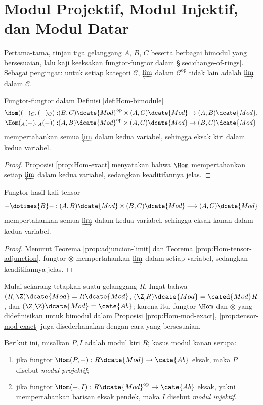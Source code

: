 \section{Modul Projektif, Modul Injektif, dan Modul Datar}
Pertama-tama, tinjau tiga gelanggang $A$, $B$, $C$ beserta berbagai bimodul yang bersesuaian, lalu kaji keeksakan fungtor-fungtor dalam \S\ref{sec:change-of-rings}. Sebagai pengingat: untuk setiap kategori $\mathcal{C}$, $\varprojlim$ dalam $\mathcal{C}^\text{op}$ tidak lain adalah $\varinjlim$ dalam $\mathcal{C}$.
\begin{proposition}\label{prop:Hom-mod-exact}
	Fungtor-fungtor dalam Definisi \ref{def:Hom-bimodule}
	\begin{align*}
		\Hom((-)_C, (-)_C): & (B,C)\dcate{Mod}^\text{op} \times (A,C)\dcate{Mod} \to (A,B)\dcate{Mod}, \\
		\Hom({}_A (-), {}_A(-)): & (A,B)\dcate{Mod}^\text{op} \times (A,C)\dcate{Mod} \to (B,C)\dcate{Mod}
	\end{align*}
	mempertahankan semua $\varprojlim$ dalam kedua variabel, sehingga eksak kiri dalam kedua variabel.
\end{proposition}
\begin{proof}
	Proposisi \ref{prop:Hom-exact} menyatakan bahwa $\Hom$ mempertahankan setiap $\varprojlim$ dalam kedua variabel, sedangkan keaditifannya jelas.
\end{proof}

\begin{proposition}\label{prop:tensor-mod-exact}
	Fungtor hasil kali tensor
	\[ - \dotimes{B} -: (A,B)\dcate{Mod} \times (B,C)\dcate{Mod} \longrightarrow (A,C)\dcate{Mod} \]
	mempertahankan semua $\varinjlim$ dalam kedua variabel, sehingga eksak kanan dalam kedua variabel.
\end{proposition}
\begin{proof}
	Menurut Teorema \ref{prop:adjuncion-limit} dan Teorema \ref{prop:Hom-tensor-adjunction}, fungtor $\otimes$ mempertahankan $\varinjlim$ dalam setiap variabel, sedangkan keaditifannya jelas.
\end{proof}

Mulai sekarang tetapkan suatu gelanggang $R$. Ingat bahwa $(R, \Z)\dcate{Mod} = R\dcate{Mod}$, $(\Z_, R)\dcate{Mod} = \cated{Mod}R$, dan $(\Z_, \Z)\dcate{Mod} = \cate{Ab}$; karena itu, fungtor $\Hom$ dan $\otimes$ yang didefinisikan untuk bimodul dalam Proposisi \ref{prop:Hom-mod-exact}, \ref{prop:tensor-mod-exact} juga disederhanakan dengan cara yang bersesuaian.

\begin{definition}\label{def:inj-proj-modules}
	Berikut ini, misalkan $P, I$ adalah modul kiri $R$; kasus modul kanan serupa:
	\begin{enumerate}
		\item jika fungtor $\Hom(P, -): R\dcate{Mod} \to \cate{Ab}$ eksak, maka $P$ disebut \emph{modul projektif};
		\item jika fungtor $\Hom(-, I): R\dcate{Mod}^\text{op} \to \cate{Ab}$ eksak, yakni mempertahankan barisan eksak pendek, maka $I$ disebut \emph{modul injektif}.
	\end{enumerate}
\end{definition}

